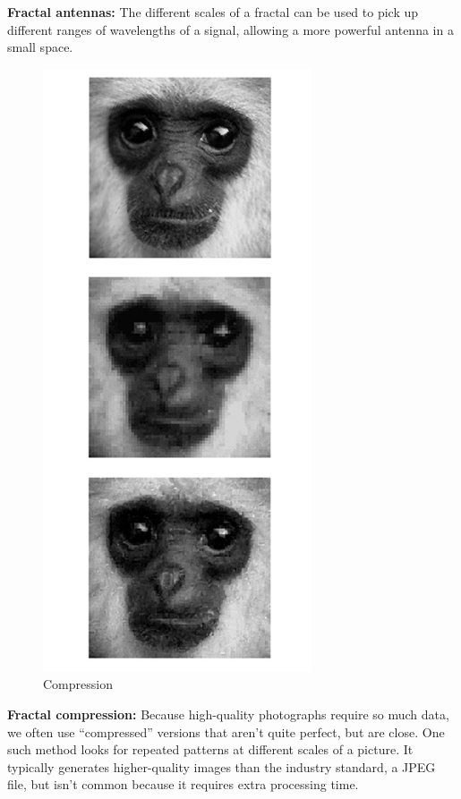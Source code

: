 \documentclass{article}
\begin{document}
\begin{itemize}
\textbf{Fractal antennas:} The different scales of a fractal can be used to pick up different ranges of wavelengths of a signal, allowing a more powerful antenna in a small space.
\begin{figure}[H]
\centering
\includegraphics[scale=0.45]{DSC-B0818_18.jpg}
\caption{Compression}
\end{figure}

\textbf{Fractal compression:} Because high-quality photographs require so much data, we often use “compressed” versions that aren’t quite perfect, but are close. One such method looks for repeated patterns at different scales of a picture. It typically generates higher-quality images than the industry standard, a JPEG file, but isn’t common because it requires extra processing time.


\end{itemize}
\end{document}
